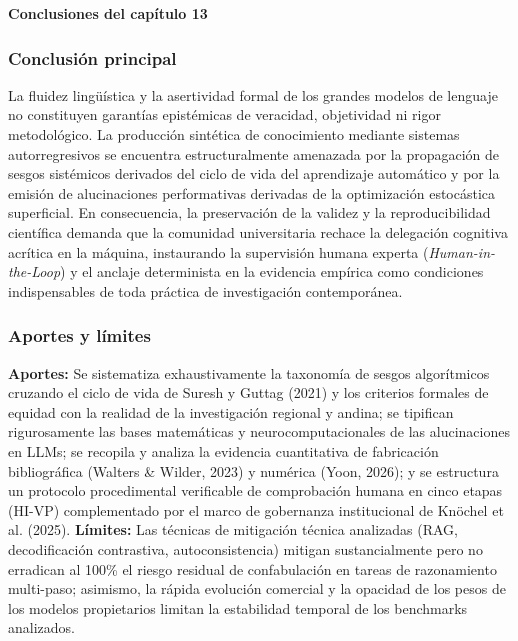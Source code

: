 \newpage
{}
\vspace*{0.8cm}
{\Huge \textbf{Conclusiones del capítulo 13}}
\vspace{0.8cm}

\subsubsection*{Conclusión principal}
La fluidez lingüística y la asertividad formal de los grandes modelos de lenguaje no constituyen garantías epistémicas de veracidad, objetividad ni rigor metodológico. La producción sintética de conocimiento mediante sistemas autorregresivos se encuentra estructuralmente amenazada por la propagación de sesgos sistémicos derivados del ciclo de vida del aprendizaje automático y por la emisión de alucinaciones performativas derivadas de la optimización estocástica superficial. En consecuencia, la preservación de la validez y la reproducibilidad científica demanda que la comunidad universitaria rechace la delegación cognitiva acrítica en la máquina, instaurando la supervisión humana experta (\textit{Human-in-the-Loop}) y el anclaje determinista en la evidencia empírica como condiciones indispensables de toda práctica de investigación contemporánea.

\subsubsection*{Aportes y límites}
\textbf{Aportes:} Se sistematiza exhaustivamente la taxonomía de sesgos algorítmicos cruzando el ciclo de vida de Suresh y Guttag (2021) y los criterios formales de equidad con la realidad de la investigación regional y andina; se tipifican rigurosamente las bases matemáticas y neurocomputacionales de las alucinaciones en LLMs; se recopila y analiza la evidencia cuantitativa de fabricación bibliográfica (Walters \& Wilder, 2023) y numérica (Yoon, 2026); y se estructura un protocolo procedimental verificable de comprobación humana en cinco etapas (HI-VP) complementado por el marco de gobernanza institucional de Knöchel et al. (2025). \textbf{Límites:} Las técnicas de mitigación técnica analizadas (RAG, decodificación contrastiva, autoconsistencia) mitigan sustancialmente pero no erradican al 100\% el riesgo residual de confabulación en tareas de razonamiento multi-paso; asimismo, la rápida evolución comercial y la opacidad de los pesos de los modelos propietarios limitan la estabilidad temporal de los benchmarks analizados.


